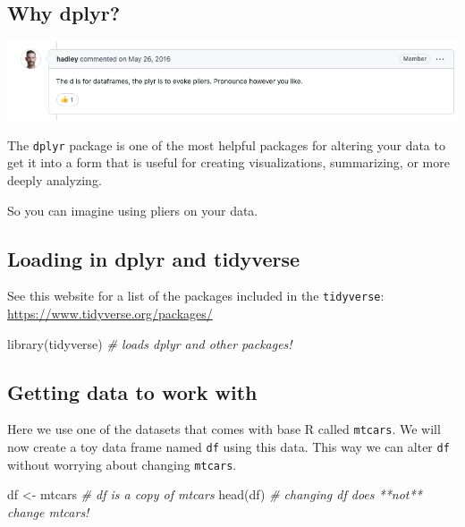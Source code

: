 \documentclass[
]{article}
\newenvironment{Shaded}{\begin{snugshade}}{\end{snugshade}}
\newcommand{\CommentTok}[1]{\textcolor[rgb]{0.56,0.35,0.01}{\textit{#1}}}
\newcommand{\FunctionTok}[1]{\textcolor[rgb]{0.00,0.00,0.00}{#1}}
\newcommand{\NormalTok}[1]{#1}
\newcommand{\OtherTok}[1]{\textcolor[rgb]{0.56,0.35,0.01}{#1}}
\begin{document}
\hypertarget{why-dplyr}{%
\subsection{Why dplyr?}\label{why-dplyr}}

\begin{center}\includegraphics[width=1\linewidth]{images/dplyr} \end{center}

The \texttt{dplyr} package is one of the most helpful packages for
altering your data to get it into a form that is useful for creating
visualizations, summarizing, or more deeply analyzing.

So you can imagine using pliers on your data.

\hypertarget{loading-in-dplyr-and-tidyverse}{%
\subsection{Loading in dplyr and
tidyverse}\label{loading-in-dplyr-and-tidyverse}}

See this website for a list of the packages included in the
\texttt{tidyverse}: \url{https://www.tidyverse.org/packages/}

\begin{Shaded}
\begin{Highlighting}[]
\FunctionTok{library}\NormalTok{(tidyverse) }\CommentTok{\# loads dplyr and other packages!}
\end{Highlighting}
\end{Shaded}

\hypertarget{getting-data-to-work-with}{%
\subsection{Getting data to work with}\label{getting-data-to-work-with}}

Here we use one of the datasets that comes with base R called
\texttt{mtcars}. We will now create a toy data frame named \texttt{df}
using this data. This way we can alter \texttt{df} without worrying
about changing \texttt{mtcars}.

\begin{Shaded}
\begin{Highlighting}[]
\NormalTok{df }\OtherTok{\textless{}{-}}\NormalTok{ mtcars }\CommentTok{\# df is a copy of mtcars}
\FunctionTok{head}\NormalTok{(df) }\CommentTok{\# changing df does **not** change mtcars!}
\end{Highlighting}
\end{Shaded}
\end{document}
